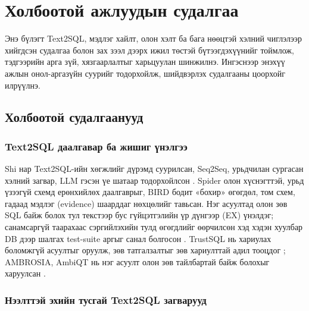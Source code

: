 
\chapter{Холбоотой ажлуудын судалгаа}
\label{ch:related}
\pagecolor{white}

Энэ бүлэгт Text2SQL, мэдлэг хайлт, олон хэлт ба бага нөөцтэй хэлний чиглэлээр хийгдсэн судалгаа болон зах зээл дээрх
ижил төстэй бүтээгдэхүүнийг тоймлож, тэдгээрийн арга зүй, хязгаарлалтыг харьцуулан шинжилнэ. Ингэснээр энэхүү ажлын
онол-аргазүйн суурийг тодорхойлж, шийдвэрлэх судалгааны цоорхойг илрүүлнэ.

\section{Холбоотой судалгаанууд}
\label{sec:similar}

\subsection{Text2SQL даалгавар ба жишиг үнэлгээ}

Shi нар Text2SQL-ийн хөгжлийг дүрэмд суурилсан, Seq2Seq, урьдчилан сургасан хэлний загвар, LLM гэсэн үе шатаар
тодорхойлсон \cite{shi_2025_survey_llm_text2sql}. Spider \cite{yu_2018_spider} олон хүснэгттэй, урьд үзээгүй схемд
ерөнхийлөх даалгаврыг, BIRD \cite{li_2023_bird} бодит «бохир» өгөгдөл, том схем, гадаад мэдлэг (evidence) шаарддаг
нөхцөлийг тавьсан. Нэг асуултад олон зөв SQL байж болох тул текстээр бус гүйцэтгэлийн үр дүнгээр (EX) үнэлдэг; санамсаргүй
таарахаас сэргийлэхийн тулд өгөгдлийг өөрчилсөн хэд хэдэн хуулбар DB дээр шалгах test-suite аргыг санал болгосон
\cite{zhong_2020_test_suite}. TrustSQL нь хариулах боломжгүй асуултыг оруулж, зөв татгалзалтыг зөв хариулттай адил
тооцдог \cite{lee_2024_trustsql}; AMBROSIA, AmbiQT нь нэг асуулт олон зөв тайлбартай байж болохыг харуулсан
\cite{saparina_2024_ambrosia, bhaskar_2023_ambiqt}.

\subsection{Нээлттэй эхийн тусгай Text2SQL загварууд}


